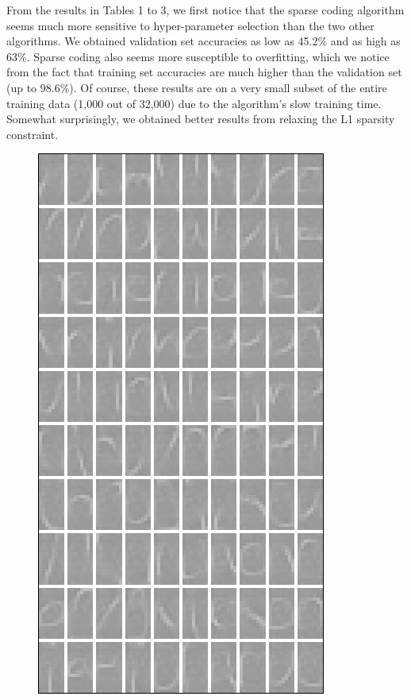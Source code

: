 \documentclass{article} %
\begin{document}
From the results in Tables 1 to 3, we first notice that the sparse coding algorithm seems much more sensitive to hyper-parameter selection than the two other algorithms. We obtained validation set accuracies as low as 45.2\% and as high as 63\%. Sparse coding also seems more susceptible to overfitting, which we notice from the fact that training set accuracies are much higher than the validation set (up to 98.6\%). Of course, these results are on a very small subset of the entire training data (1,000 out of 32,000) due to the algorithm's slow training time. Somewhat surprisingly, we obtained better results from relaxing the L1 sparsity constraint.
\begin{figure}
\centering
\includegraphics[scale=0.577]{figures/filters_100_clean.png}
\quad\quad\quad

\end{figure}
\end{document}

